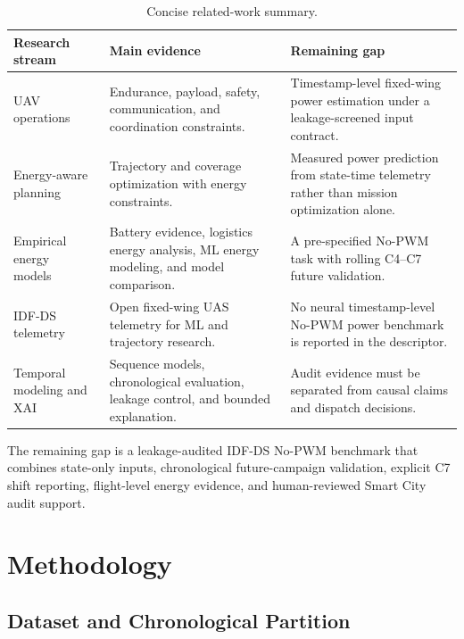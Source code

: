 \documentclass[runningheads,a4paper]{llncs}
\begin{document}
\begin{table}[!htbp]
\caption{Concise related-work summary.}
\label{tab:related}
\centering
{\small
\renewcommand{\arraystretch}{0.95}
\begin{tabular}{p{2.7cm} p{4.2cm} p{4.0cm}}
\toprule
Research stream & Main evidence & Remaining gap \\
\midrule
UAV operations~\cite{shakhatreh2019survey,mozaffari2019tutorial,hayat2016survey} &
Endurance, payload, safety, communication, and coordination constraints. &
Timestamp-level fixed-wing power estimation under a leakage-screened input contract. \\
Energy-aware planning~\cite{zeng2017energy,difranco2016coverage} &
Trajectory and coverage optimization with energy constraints. &
Measured power prediction from state-time telemetry rather than mission optimization alone. \\
Empirical energy models~\cite{abeywickrama2018access,stolaroff2018drone,gora2022ml,zhang2021models} &
Battery evidence, logistics energy analysis, ML energy modeling, and model comparison. &
A pre-specified No-PWM task with rolling C4--C7 future validation. \\
IDF-DS telemetry~\cite{garcia2025zenodo,garcia2026idfds} &
Open fixed-wing UAS telemetry for ML and trajectory research. &
No neural timestamp-level No-PWM power benchmark is reported in the descriptor. \\
Temporal modeling and XAI~\cite{cho2014gru,hochreiter1997lstm,bai2018tcn,bergmeir2018cv,kaufman2012leakage,lundberg2017shap,arrieta2020xai} &
Sequence models, chronological evaluation, leakage control, and bounded explanation. &
Audit evidence must be separated from causal claims and dispatch decisions. \\
\bottomrule
\end{tabular}
}
\end{table}

The remaining gap is a leakage-audited IDF-DS No-PWM benchmark that combines state-only inputs, chronological future-campaign validation, explicit C7 shift reporting, flight-level energy evidence, and human-reviewed Smart City audit support.

\section{Methodology}

\subsection{Dataset and Chronological Partition}
\end{document}
